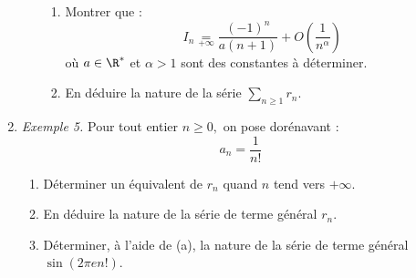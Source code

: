 \documentclass[twoside,french,11pt]{VcCours}
\begin{document}
\begin{enumerate}
\begin{enumerate}
\begin{enumerate}
  \item Montrer que :
  $$ I_n \underset{+ \infty}{=} \frac{(-1)^n}{a(n+1)}+O\left(\frac{1}{n^{\alpha}}\right)$$
  o\`u $a\in\R^*$ et $\alpha>1$ sont des constantes à déterminer.
  \item En déduire la nature de la série $\sum_{n \geq 1} r_n$.
  \end{enumerate}
  \end{enumerate}
  \item {\it Exemple 5.}  Pour tout entier $n\geq 0,$ on pose dorénavant :
  $$a_n=\frac{1}{n!}$$
  \begin{enumerate}
  \item Déterminer un équivalent de $r_n$ quand $n$ tend vers $+ \infty$.
  \item En déduire la nature de la série de terme général $r_n$.
  \item Déterminer, à l'aide de (a), la nature de la série de terme général $\sin(2 \pi e n!)$.
  \end{enumerate}
  \end{enumerate}
  
  
  
\end{document}
